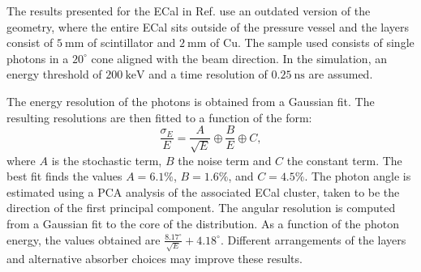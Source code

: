 The results presented for the ECal in Ref. \cite{DUNE2021NDCDR} use an outdated version of the geometry, where the entire ECal sits outside of the pressure vessel and the layers consist of $5~\mathrm{mm}$ of scintillator and $2~\mathrm{mm}$ of Cu. The sample used consists of single photons in a $20^{\circ}$ cone aligned with the beam direction. In the simulation, an energy threshold of $200~\mathrm{keV}$ and a time resolution of $0.25~\mathrm{ns}$ are assumed.

The energy resolution of the photons is obtained from a Gaussian fit. The resulting resolutions are then fitted to a function of the form:
\begin{equation}
    \frac{\sigma_{E}}{E} = \frac{A}{\sqrt{E}} \oplus \frac{B}{E} \oplus C,
\end{equation}
where $A$ is the stochastic term, $B$ the noise term and $C$ the constant term. The best fit finds the values $A=6.1\%$, $B=1.6\%$, and $C=4.5\%$. The photon angle is estimated using a PCA analysis of the associated ECal cluster, taken to be the direction of the first principal component. The angular resolution is computed from a Gaussian fit to the core of the distribution. As a function of the photon energy, the values obtained are $\frac{8.17^{\circ}}{\sqrt{E}} + 4.18^{\circ}$. Different arrangements of the layers and alternative absorber choices may improve these results.
